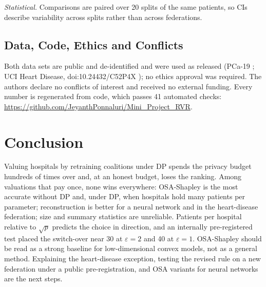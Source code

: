 \documentclass[journal]{IEEEtran}
\begin{document}
\emph{Statistical.} Comparisons are paired over 20 splits of the same patients, so CIs describe variability across splits rather than across federations.

\subsection{Data, Code, Ethics and Conflicts}

Both data sets are public and de-identified and were used as released (PCa-19 \cite{Kazlouski2025HospitalParticipation}; UCI Heart Disease, doi:10.24432/C52P4X \cite{Janosi1988HeartDisease}); no ethics approval was required. The authors declare no conflicts of interest and received no external funding. Every number is regenerated from code, which passes 41 automated checks: \url{https://github.com/JeyanthPonnaluri/Mini_Project_RVR}.

\section{Conclusion}
\label{sec:conclusion}
Valuing hospitals by retraining coalitions under DP spends the privacy budget hundreds of times over and, at an honest budget, loses the ranking. Among valuations that pay once, none wins everywhere: OSA-Shapley is the most accurate without DP and, under DP, when hospitals hold many patients per parameter; reconstruction is better for a neural network and in the heart-disease federation; size and summary statistics are unreliable. Patients per hospital relative to $\sqrt{p}$ predicts the choice in direction, and an internally pre-registered test placed the switch-over near 30 at $\varepsilon=2$ and 40 at $\varepsilon=1$. OSA-Shapley should be read as a strong baseline for low-dimensional convex models, not as a general method. Explaining the heart-disease exception, testing the revised rule on a new federation under a public pre-registration, and OSA variants for neural networks are the next steps.



\end{document}
